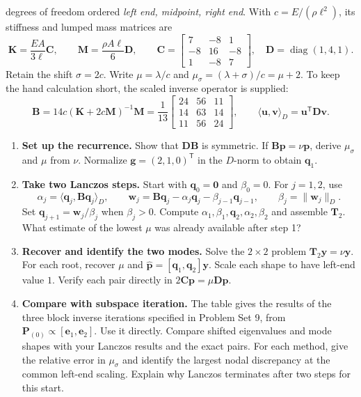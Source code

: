 \documentclass[12pt]{article}
\newcommand{\T}{^{\mathsf T}}
\newcommand{\vct}[1]{\mathbf{#1}}
\newcommand{\colv}[1]{\begin{bmatrix}#1\end{bmatrix}}
\begin{document}
degrees of freedom ordered \emph{left end, midpoint, right end}. With
$c=E/(\rho\ell^2)$, its stiffness and lumped mass matrices are
\[
  \vct K=\frac{EA}{3\ell}\vct C,\qquad
  \vct M=\frac{\rho A\ell}{6}\vct D,\qquad
  \vct C=\colv{7&-8&1\\-8&16&-8\\1&-8&7},\quad
  \vct D=\operatorname{diag}(1,4,1).
\]
Retain the shift $\sigma=2c$. Write $\mu=\lambda/c$ and
$\mu_\sigma=(\lambda+\sigma)/c=\mu+2$. To keep the hand calculation short,
the scaled inverse operator is supplied:
\[
  \vct B=14c(\vct K+2c\vct M)^{-1}\vct M
  =\frac1{13}\colv{24&56&11\\14&63&14\\11&56&24},
  \qquad \langle\vct u,\vct v\rangle_D=\vct u\T\vct D\vct v .
\]
\begin{enumerate}
  \item \textbf{Set up the recurrence.} Show that $\vct D\vct B$ is symmetric.
        If $\vct B\vct p=\nu\vct p$, derive $\mu_\sigma$ and $\mu$ from $\nu$.
        Normalize $\vct g=(2,1,0)\T$ in the $D$-norm to obtain $\vct q_1$.
  \item \textbf{Take two Lanczos steps.} Start with $\vct q_0=\vct0$ and
        $\beta_0=0$. For $j=1,2$, use
        \[
          \alpha_j=\langle\vct q_j,\vct B\vct q_j\rangle_D,\qquad
          \vct w_j=\vct B\vct q_j-\alpha_j\vct q_j-\beta_{j-1}\vct q_{j-1},
          \qquad \beta_j=\|\vct w_j\|_D .
        \]
        Set $\vct q_{j+1}=\vct w_j/\beta_j$ when $\beta_j>0$.
        Compute $\alpha_1,\beta_1,\vct q_2,\alpha_2,\beta_2$ and assemble $\vct T_2$.
        What estimate of the lowest $\mu$ was already available after step 1?
  \item \textbf{Recover and identify the two modes.} Solve the $2\times2$
        problem $\vct T_2\vct y=\nu\vct y$. For each root, recover $\mu$ and
        $\widehat{\vct p}=[\vct q_1,\vct q_2]\vct y$. Scale each shape to have
        left-end value $1$. Verify each pair directly in $2\vct C\vct p=\mu\vct D\vct p$.
  \item \textbf{Compare with subspace iteration.} The table gives the results
        of the three block inverse iterations specified in Problem Set 9, from
        $\vct P_{(0)}\propto[\vct e_1,\vct e_2]$. Use it directly.
        Compare shifted eigenvalues and mode shapes with your Lanczos results and
        the exact pairs. For each method, give the relative error in $\mu_\sigma$
        and identify the largest nodal discrepancy at the common left-end scaling.
        Explain why Lanczos terminates after two steps for this start.
\end{enumerate}
\end{document}
